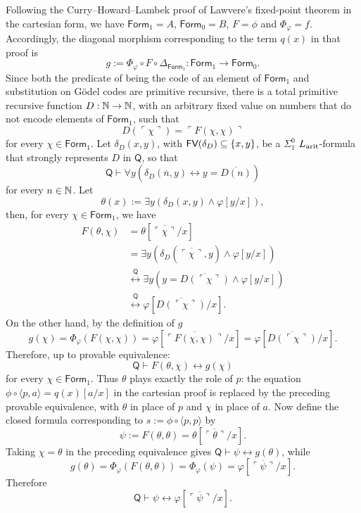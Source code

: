 \begin{remark}
    Following the Curry--Howard--Lambek proof of Lawvere's fixed-point theorem in the cartesian form, we have $\mathsf{Form}_1 = A$, $\mathsf{Form}_0 = B$, $F = \phi$ and $\Phi_\varphi = f$. Accordingly, the diagonal morphism corresponding to the term $q(x)$ in that proof is
    \[ g := \Phi_\varphi\circ F\circ\Delta_{\mathsf{Form}_1} : \mathsf{Form}_1\to\mathsf{Form}_0. \]
    Since both the predicate of being the code of an element of $\mathsf{Form}_1$ and substitution on Gödel codes are primitive recursive, there is a total primitive recursive function $D:\mathbb{N}\to\mathbb{N}$, with an arbitrary fixed value on numbers that do not encode elements of $\mathsf{Form}_1$, such that
    \[ D(\ulcorner\chi\urcorner) = \ulcorner F(\chi,\chi)\urcorner \]
    for every $\chi\in\mathsf{Form}_1$. Let $\delta_D(x,y)$, with $\textsf{FV}(\delta_D)\subseteq\{x,y\}$, be a $\Sigma_1^0$ $L_{\textnormal{arit}}$-formula that strongly represents $D$ in $\mathsf Q$, so that
    \[ \mathsf Q\vdash\forall y\left(\delta_D(\overline n,y)\leftrightarrow y = \overline{D(n)}\right) \]
    for every $n\in\mathbb{N}$. Let
    \[ \theta(x) := \exists y\left(\delta_D(x,y)\land\varphi[y/x]\right), \]
    then, for every $\chi\in\mathsf{Form}_1$, we have
    \begin{align*}
        F(\theta,\chi) &= \theta[\overline{\ulcorner\chi\urcorner}/x] \\
                       &= \exists y\left(\delta_D(\overline{\ulcorner\chi\urcorner},y)\land\varphi[y/x]\right) \\
                       &\overset{\mathsf Q}{\leftrightarrow} \exists y \left(y = \overline{D(\ulcorner\chi\urcorner)}\land\varphi[y/x]\right) \\
                       &\overset{\mathsf Q}{\leftrightarrow} \varphi[\overline{D(\ulcorner\chi\urcorner)}/x].
    \end{align*}
    On the other hand, by the definition of $g$
    \[ g(\chi) = \Phi_\varphi(F(\chi,\chi)) = \varphi[\overline{\ulcorner F(\chi,\chi)\urcorner}/x] = \varphi[\overline{D(\ulcorner\chi\urcorner)}/x]. \]
    Therefore, up to provable equivalence:
    \[ \mathsf Q\vdash F(\theta,\chi)\leftrightarrow g(\chi) \]
    for every $\chi\in\mathsf{Form}_1$. Thus $\theta$ plays exactly the role of $p$: the equation $\phi\circ\langle p,a\rangle = q(x)[a/x]$ in the cartesian proof is replaced by the preceding provable equivalence, with $\theta$ in place of $p$ and $\chi$ in place of $a$. Now define the closed formula corresponding to $s:=\phi\circ\langle p,p\rangle$ by
    \[ \psi := F(\theta,\theta) = \theta[\overline{\ulcorner\theta\urcorner}/x]. \]
    Taking $\chi = \theta$ in the preceding equivalence gives $\mathsf Q\vdash\psi\leftrightarrow g(\theta)$, while
    \[ g(\theta) = \Phi_\varphi(F(\theta,\theta)) = \Phi_\varphi(\psi) = \varphi[\overline{\ulcorner\psi\urcorner}/x]. \]
    Therefore
    \[ \mathsf Q\vdash\psi\leftrightarrow\varphi[\overline{\ulcorner\psi\urcorner}/x]. \]
\end{remark}

